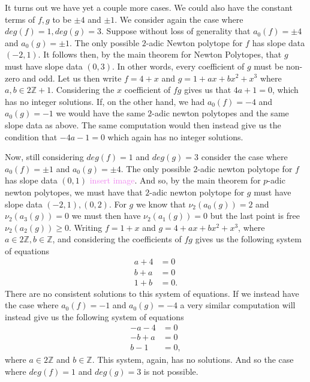 \documentclass[12pt,letterpaper,boxed]{hmcpset}
\newcommand{\wg}[1]{\textcolor{violet}{#1}}
\newcommand{\Z}{\mathbb Z}
\begin{document}
\begin{solution}
\begin{itemize}
It turns out we have yet a couple more cases. We could also have
the constant terms of $f,g$ to be $\pm 4$ and $\pm 1$.
We consider again the case where $deg(f) = 1, deg(g) = 3$.
Suppose without loss of generality that $a_0(f) = \pm 4$ and $a_0(g) =
\pm 1$. The only possible $2$-adic Newton polytope for $f$ has slope
data $(-2,1)$. It follows then, by the main theorem for Newton
Polytopes, that $g$ must have slope data $(0, 3)$. In other words,
every coefficient of $g$ must be non-zero and odd. Let us then write
$f = 4 + x$ and $g = 1 + ax + bx^2 + x^3$ where $a,b \in 2\Z + 1$. 
Considering the $x$ coefficient of $fg$ gives us that $4a + 1 = 0$,
which has no integer solutions. If, on the other hand, we had $a_0(f)
= -4$ and $a_0(g) = -1$ we would have the same $2$-adic newton
polytopes and the same slope data as above. The same computation would
then instead give us the condition that $-4a - 1 = 0$ which again has
no integer solutions. 

Now, still considering $deg(f) = 1$ and $deg(g) = 3$ consider the case
where $a_0(f) = \pm 1$ and $a_0(g) = \pm 4$. The only possible
$2$-adic newton polytope for $f$ has slope data $(0, 1)$
\wg{insert image}. And so, by the main theorem for $p$-adic newton
polytopes, we must have that $2$-adic newton polytope for $g$ must
have slope data $(-2, 1), (0, 2)$. For $g$ we know that $\nu_2(a_0(g))
= 2$ and $\nu_2(a_3(g)) = 0$ we must then have $\nu_2(a_1(g)) = 0$ but
the last point is free $\nu_2(a_2(g)) \geq 0$. Writing $f = 1 + x$ and
$g = 4 + ax + bx^2 + x^3$, where $a \in 2\Z, b \in \Z$,
 and considering the coefficients of $fg$ gives us the following
system of equations
\begin{align*}
	a + 4 &= 0 \\
	b + a &= 0 \\
	1 + b &= 0.
\end{align*}
There are no consistent solutions to this system of equations.
If we instead have the case where $a_0(f) = -1$ and $a_0(g) = -4$ a
very similar computation will instead give us the following system of
equations
\begin{align*}
	-a - 4 &= 0 \\
	-b + a &= 0 \\
	b - 1 &= 0,
\end{align*}
where $a \in 2\Z$ and $b \in \Z$. This system, again, has no
solutions. And so the case where $deg(f) = 1$ and $deg(g) = 3$ is not
possible.


\end{itemize}
\end{solution}
\end{document}

